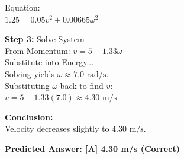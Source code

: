 \begin{minipage}{\linewidth}
\begin{tcolorbox}[
    title={\textbf{JEE Advanced 2023 Paper 1}},
    colback=white,
    colframe=gray!50!black,
    arc=3pt,
    boxrule=1pt,
    fonttitle=\sffamily\large,
    width=\linewidth
]
\begin{minipage}[t]{0.49\linewidth}
\begin{tcolorbox}
            Equation:\\
            $1.25 = 0.05 v^2 + 0.00665 \omega^2$
            \vspace{1em}
            
            \textbf{\textcolor{green!40!black}{Step 3:}} Solve System\\
            From Momentum: $v = 5 - 1.33\omega$\\
            Substitute into Energy...\\
            Solving yields $\omega \approx 7.0\text{ rad/s}$.\\
            Substituting $\omega$ back to find $v$:\\
            $v = 5 - 1.33(7.0) \approx 4.30\text{ m/s}$
            \vspace{1em}
            
            \textbf{Conclusion:}\\
            Velocity decreases slightly to $4.30\text{ m/s}$.
            \vspace{1em}
            
            \textbf{Predicted Answer: [A] 4.30 m/s (Correct)}
        \end{tcolorbox}
    \end{minipage}

\end{tcolorbox}

    \label{fig:jee_2023_p1}
\end{minipage}
